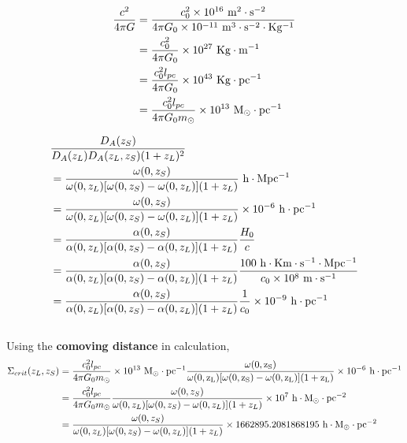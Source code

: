 \documentclass[12pt, a4paper]{article}
\begin{document}
\begin{align}
\frac{c^2}{4\pi G} 
&=\frac{c_0^2\times 10^{16}\ \rm{m^2\cdot s^{-2} }}{4\pi G_0\times 10^{-11}\  \rm{m^3\cdot s^{-2} \cdot Kg^{-1}}} \nonumber \\
&=\frac{c_0^2}{4\pi G_0}\times 10^{27} \ \rm{Kg \cdot m^{-1}} \nonumber \\
&=\frac{c_0^2 l_{pc}}{4\pi G_0}\times 10^{43} \ \rm{Kg \cdot pc^{-1}} \nonumber \\
&=\frac{c_0^2 l_{pc}}{4\pi G_0 m_{\odot}}\times 10^{13} \ \rm{M_{\odot} \cdot pc^{-1}} 
\end{align}

\begin{align}
&\frac{D_A (z_S)}{D_A (z_L) D_A (z_L, z_S) (1+z_L)^2} \nonumber \\
&=\frac{\omega(0,z_S)}{\omega(0,z_L)[\omega(0,z_S) - \omega(0,z_L)] (1+z_L)}\ \rm{h \cdot Mpc^{-1}} \\
&=\frac{\omega(0,z_S)}{\omega(0,z_L)[\omega(0,z_S) - \omega(0,z_L)] (1+z_L)}\times 10^{-6}\ \rm{h \cdot pc^{-1}} \\
&=\frac{\alpha(0,z_S)}{\alpha(0,z_L)[\alpha(0,z_S) - \alpha(0,z_L)] (1+z_L)}\frac{H_0}{c} \\
&=\frac{\alpha(0,z_S)}{\alpha(0,z_L)[\alpha(0,z_S) - \alpha(0,z_L)] (1+z_L)}\frac{100 \ \rm{h \cdot Km \cdot s^{-1} \cdot Mpc^{-1}}}{c_0\times 10^8 \ \rm{m \cdot s^{-1}}} \\
&=\frac{\alpha(0,z_S)}{\alpha(0,z_L)[\alpha(0,z_S) - \alpha(0,z_L)] (1+z_L)} \frac{1}{c_0} \times 10^{-9} \ \rm{h \cdot pc^{-1}}
\end{align}
\\

Using the \textbf{comoving distance} in calculation,
\begin{align}
\Sigma_{crit}(z_L, z_S) &= \frac{c_0^2 l_{pc}}{4\pi G_0 m_{\odot}}\times 10^{13} \ \rm{M_{\odot} \cdot pc^{-1}} \frac{\omega(0,z_S)}{\omega(0,z_L)[\omega(0,z_S) - \omega(0,z_L)] (1+z_L)}\times 10^{-6}\ \rm{h \cdot pc^{-1}} \nonumber\\
&=\frac{c_0^2 l_{pc}}{4\pi G_0 m_{\odot}}\frac{\omega(0,z_S)}{\omega(0,z_L)[\omega(0,z_S) - \omega(0,z_L)] (1+z_L)}\times 10^7 \ \rm{h \cdot M_{\odot}\cdot pc^{-2}} \nonumber\\
&=\frac{\omega(0,z_S)}{\omega(0,z_L)[\omega(0,z_S) - \omega(0,z_L)] (1+z_L)}\times 1662895.2081868195 \ \rm{h \cdot M_{\odot} \cdot pc^{-2}}
\end{align}
\\
\end{document}
